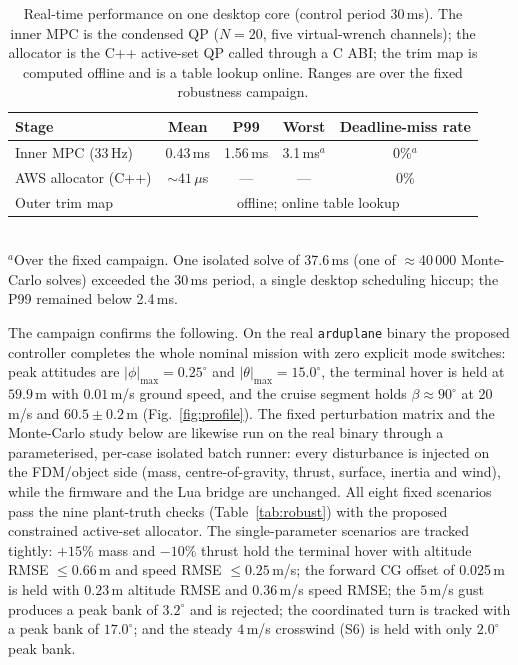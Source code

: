\documentclass[preprint,3p,11pt]{elsarticle}
\begin{document}
\begin{table}[t]
\centering
\caption{Real-time performance on one desktop core (control period 30\,ms).
The inner MPC is the condensed QP ($N=20$, five virtual-wrench channels);
the allocator is the C++ active-set QP called through a C ABI; the trim map is
computed offline and is a table lookup online. Ranges are over the fixed
robustness campaign.}
\label{tab:rt}
\small
\begin{tabular}{lcccc}
\toprule
Stage & Mean & P99 & Worst & Deadline-miss rate \\
\midrule
Inner MPC (33\,Hz) & 0.43\,ms & 1.56\,ms & 3.1\,ms$^{a}$ & 0\%$^{a}$ \\
AWS allocator (C++) & $\sim 41\,\mu$s & --- & --- & 0\% \\
Outer trim map & \multicolumn{4}{c}{offline; online table lookup} \\
\bottomrule
\end{tabular}\\[2pt]
\footnotesize $^{a}$Over the fixed campaign. One isolated solve of 37.6\,ms
(one of $\approx$40\,000 Monte-Carlo solves) exceeded the 30\,ms period, a
single desktop scheduling hiccup; the P99 remained below 2.4\,ms.
\end{table}

The campaign confirms the following. On the real \texttt{arduplane} binary the
proposed controller completes the whole nominal mission with zero explicit mode
switches: peak attitudes are $|\phi|_{\max}=0.25^\circ$ and
$|\theta|_{\max}=15.0^\circ$, the terminal hover is held at $59.9$\,m with
$0.01$\,m/s ground speed, and the cruise segment holds $\beta\approx90^\circ$ at
$20$\,m/s and $60.5\pm0.2$\,m (Fig.~\ref{fig:profile}). The fixed perturbation
matrix and the Monte-Carlo study below are likewise run on the real binary
through a parameterised, per-case isolated batch runner: every disturbance is
injected on the FDM/object side (mass, centre-of-gravity, thrust, surface,
inertia and wind), while the firmware and the Lua bridge are unchanged.
All eight fixed scenarios pass the nine plant-truth checks
(Table~\ref{tab:robust}) with the proposed constrained active-set allocator.
The single-parameter scenarios are tracked tightly:
$+15\%$ mass and $-10\%$ thrust hold the terminal hover with altitude RMSE
$\le 0.66$\,m and speed RMSE $\le 0.25$\,m/s; the forward CG offset of
0.025\,m is held with $0.23$\,m altitude RMSE and $0.36$\,m/s speed RMSE; the
$5$\,m/s gust produces a peak bank of $3.2^\circ$ and is rejected; the
coordinated turn is tracked with a peak bank of $17.0^\circ$; and the steady
$4$\,m/s crosswind (S6) is held with only $2.0^\circ$ peak bank.
\end{document}
